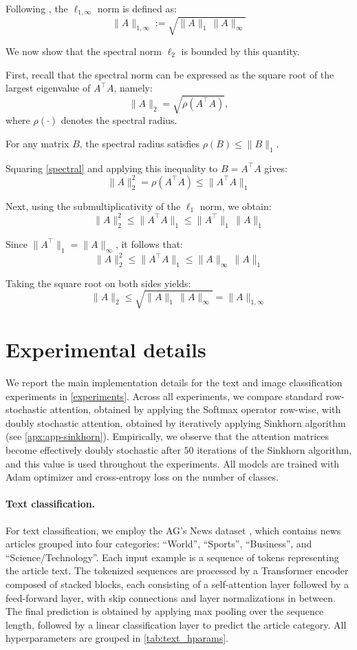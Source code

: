 \documentclass{article}
\theoremstyle{definition}
\theoremstyle{plain}
\begin{document}
\begin{appendices}
Following \cite{dong2021attention}, the $\ell_{1,\infty}$ norm is defined as:
\[
\|A\|_{1,\infty} := \sqrt{\|A\|_1 \, \|A\|_\infty}
\]

We now show that the spectral norm $\ell_2$ is bounded by this quantity.  

First, recall that the spectral norm can be expressed as the square root of the largest eigenvalue of $A^\top A$, namely:
\begin{equation}\label{spectral}
\|A\|_2 = \sqrt{\rho(A^\top A)},
\end{equation}
where $\rho(\cdot)$ denotes the spectral radius.

For any matrix \(B\), the spectral radius satisfies \(\rho(B) \le \|B\|_1\).  

Squaring \ref{spectral} and applying this inequality to \(B = A^\top A\) gives:
\[
\|A\|_2^2 = \rho(A^\top A) \le \|A^\top A\|_1
\]

Next, using the submultiplicativity of the $\ell_1$ norm, we obtain:
\[
\|A\|_2^2 \le \|A^\top A\|_1 \le \|A^\top\|_1 \, \|A\|_1
\]

Since \(\|A^\top\|_1 = \|A\|_\infty\), it follows that:
\[
\|A\|_2^2 \le \|A^\top A\|_1 \le \|A\|_\infty \, \|A\|_1
\]

Taking the square root on both sides yields:
\[
\|A\|_2 \le \sqrt{\|A\|_1 \, \|A\|_\infty} = \|A\|_{1,\infty}
\]

\section{Experimental details} \label{expe-details}

{We report the main implementation details for the text and image classification experiments in \cref{experiments}. Across all experiments, we compare standard row-stochastic attention, obtained by applying the Softmax operator row-wise, with doubly stochastic attention, obtained by iteratively applying Sinkhorn algorithm (see \cref{apx:app-sinkhorn}). Empirically, we observe that the attention matrices become effectively doubly stochastic after $50$ iterations of the Sinkhorn algorithm, and this value is used throughout the experiments. All models are trained with Adam optimizer \cite{adam} and cross-entropy loss on the number of classes.}

\paragraph{Text classification.}
{For text classification, we employ the AG’s News dataset \cite{ag_news}, which contains news articles grouped into four categories: ``World'', ``Sports'', ``Business'', and ``Science/Technology''. Each input example is a sequence of tokens representing the article text. The tokenized sequences are processed by a Transformer encoder composed of stacked blocks, each consisting of a self-attention layer followed by a feed-forward layer, with skip connections and layer normalizations in between. The final prediction is obtained by applying max pooling over the sequence length, followed by a linear classification layer to predict the article category. All hyperparameters are grouped in \cref{tab:text_hparams}.}


\end{appendices}
\end{document}
